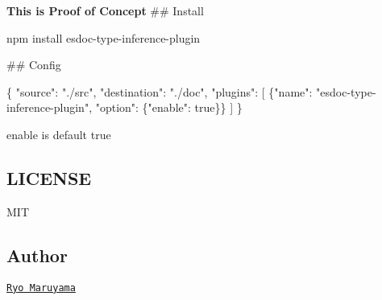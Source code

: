 {\bfseries This is Proof of Concept} \#\# Install 
\begin{DoxyCode}
npm install esdoc-type-inference-plugin
\end{DoxyCode}


\#\# Config 
\begin{DoxyCode}
\{
  "source": "./src",
  "destination": "./doc",
  "plugins": [
    \{"name": "esdoc-type-inference-plugin", "option": \{"enable": true\}\}
  ]
\}
\end{DoxyCode}



\begin{DoxyItemize}
\item {\ttfamily enable} is default {\ttfamily true}
\end{DoxyItemize}

\subsection*{L\+I\+C\+E\+N\+SE}

M\+IT

\subsection*{Author}

\href{https://github.com/h13i32maru}{\tt Ryo Maruyama} 